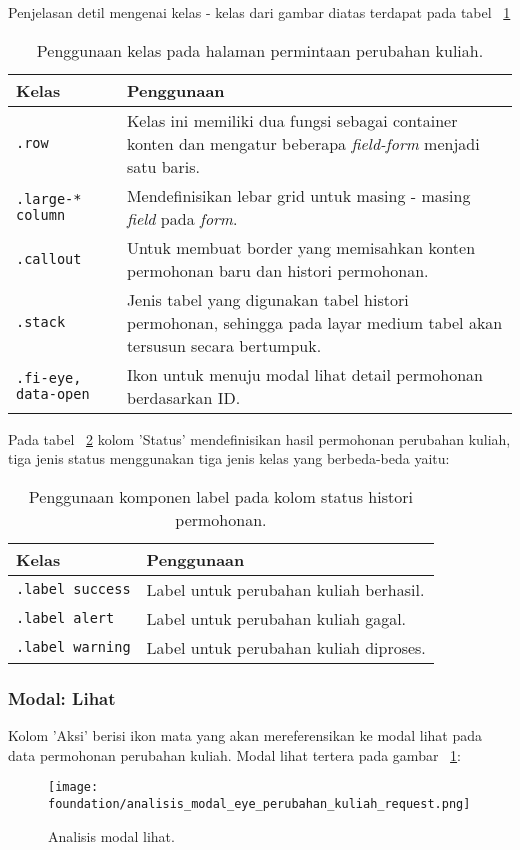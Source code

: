 Penjelasan detil mengenai kelas - kelas dari gambar diatas terdapat pada tabel ~\ref{table:analisisPermintaanPerubahanKuliah} 
\begin{table}[H]
	\centering
	\caption{Penggunaan kelas pada halaman permintaan perubahan kuliah.}
	\begin{tabularx}{\textwidth}{lX}
		\toprule
		Kelas     & Penggunaan \\
		\midrule
		 \texttt{.row} & Kelas ini memiliki dua fungsi sebagai container konten dan mengatur beberapa \textit{field-form} menjadi satu baris. \\
		 \texttt{.large-* column} & Mendefinisikan lebar grid untuk masing - masing \textit{field} pada \textit{form}. \\
		 \texttt{.callout} & Untuk membuat border yang memisahkan konten permohonan baru dan histori permohonan.\\
		 \texttt{.stack} & Jenis tabel yang digunakan tabel histori permohonan, sehingga pada layar medium tabel akan tersusun secara bertumpuk.\\
		 \texttt{.fi-eye, data-open} & Ikon untuk menuju modal lihat detail permohonan berdasarkan ID.\\
		\bottomrule
	\end{tabularx}%
	\label{table:analisisPermintaanPerubahanKuliah}
\end{table}

Pada tabel ~\ref{table:analisisLabelPermintaanPerubahanKuliah} kolom 'Status' mendefinisikan hasil permohonan perubahan kuliah, tiga jenis status menggunakan tiga jenis kelas yang berbeda-beda yaitu:\\

\begin{table}[H]
	\centering
	\caption{Penggunaan komponen label pada kolom status histori permohonan.}
	\begin{tabularx}{\textwidth}{lX}
		\toprule
		Kelas     & Penggunaan \\
		\midrule
		 \texttt{.label success} & Label untuk perubahan kuliah berhasil.\\
		 \texttt{.label alert} & Label untuk perubahan kuliah gagal.\\
		 \texttt{.label warning} & Label untuk perubahan kuliah diproses.\\
		\bottomrule
	\end{tabularx}%
	\label{table:analisisLabelPermintaanPerubahanKuliah}
\end{table}

\subsubsection{Modal: Lihat}
Kolom 'Aksi' berisi ikon mata yang akan mereferensikan ke modal lihat pada data permohonan perubahan kuliah. Modal lihat tertera pada gambar ~\ref{fig:analisisModalPermintaanPerubahanKuliah}:\\
\begin{figure}[H]
	\centering  
	\texttt{[image: foundation/analisis\_modal\_eye\_perubahan\_kuliah\_request.png]}
	\caption{Analisis modal lihat.}
	\label{fig:analisisModalPermintaanPerubahanKuliah}
\end{figure}

